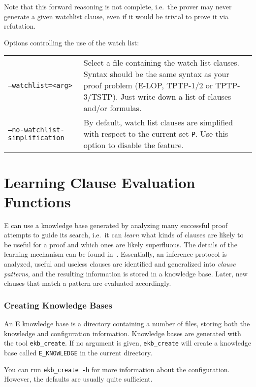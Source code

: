 \documentclass{report}
\begin{document}
Note that this forward reasoning is not complete, i.e.\ the prover may
never generate a given watchlist clause, even if it would be trivial
to prove it via refutation.

Options controlling the use of the watch list:\\
\begin{tabular}{lp{5.8cm}}
  \texttt{--watchlist=<arg>} & Select a file containing the watch list
  clauses. Syntax should be the same syntax as your proof problem
  (E-LOP\index{LOP}, TPTP-1/2 or
  TPTP-3/TSTP\index{TPTP!language}). Just write down a list of
  clauses and/or formulas.\\
  \texttt{--no-watchlist-simplification} & By default, watch list
  clauses are simplified with respect to the current set
  \texttt{P}. Use this option to disable the feature.
\end{tabular}


\section{Learning Clause Evaluation Functions}
\label{sec:options:learning}

E can use a knowledge base generated by analyzing many successful
proof attempts to guide its search, i.e.\ it can \emph{learn} what
kinds of clauses are likely to be useful for a proof and which ones
are likely superfluous. The details of the learning mechanism can be
found in~\cite{Schulz:Diss-2000,Schulz:KI-2001}. Essentially, an
inference protocol is analyzed, useful and useless clauses are
identified and generalized into \emph{clause patterns}, and the
resulting information is stored in a knowledge base. Later, new clauses
that match a pattern are evaluated accordingly.

\subsubsection{Creating Knowledge Bases}

An E knowledge base is a directory containing a number of files,
storing both the knowledge and configuration information. Knowledge
bases are generated with the tool \texttt{ekb\_create}. If no argument
is given, \texttt{ekb\_create} will create a knowledge base called
\texttt{E\_KNOWLEDGE} in the current directory.

You can run \texttt{ekb\_create -h} for more information about the
configuration. However, the defaults are usually quite sufficient.
\end{document}

